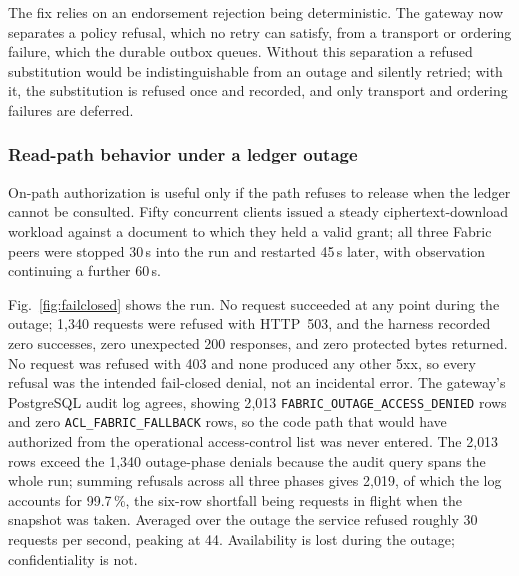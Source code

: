 \documentclass[preprint,12pt]{elsarticle}
\begin{document}
The fix relies on an endorsement rejection being
deterministic. The gateway now separates a policy refusal, which no retry can
satisfy, from a transport or ordering failure, which the durable outbox queues.
Without this separation a refused substitution would be indistinguishable from
an outage and silently retried; with it, the substitution is refused once and
recorded, and only transport and ordering failures are deferred.

\subsubsection{Read-path behavior under a ledger outage}
\label{sec:exp_failclosed}

On-path authorization is useful only if the path refuses to release when the
ledger cannot be consulted. Fifty concurrent clients
issued a steady ciphertext-download workload against a document to which they
held a valid grant; all three Fabric peers were stopped 30\,s into the run and
restarted 45\,s later, with observation continuing a further 60\,s.

Fig.~\ref{fig:failclosed} shows the run. No request succeeded at any point
during the outage; 1{,}340 requests were refused with HTTP~503, and the harness
recorded zero successes, zero unexpected 200 responses, and zero protected
bytes returned. No request was refused with
403 and none produced any other 5xx, so every refusal was the intended
fail-closed denial, not an incidental error. The gateway's PostgreSQL audit log
agrees, showing 2{,}013
\texttt{FABRIC\_\allowbreak OUTAGE\_\allowbreak ACCESS\_\allowbreak DENIED}
rows and zero \texttt{ACL\_\allowbreak FABRIC\_\allowbreak FALLBACK} rows,
so the code path that would have authorized from the operational
access-control list was never entered. The 2{,}013 rows exceed the 1{,}340
outage-phase denials because the audit query spans the whole run; summing
refusals across all three phases gives 2{,}019, of which the log accounts for
99.7\,\%, the six-row shortfall being requests in flight when the snapshot
was taken. Averaged over the outage the service refused roughly 30
requests per second, peaking at 44. Availability is lost during the outage;
confidentiality is not.
\end{document}
